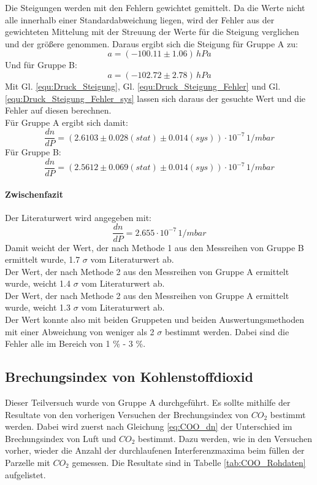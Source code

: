 \documentclass[12pt,a4paper]{article}
\begin{document}
Die Steigungen werden mit den Fehlern gewichtet gemittelt. Da die Werte nicht alle innerhalb einer Standardabweichung liegen, wird der Fehler aus der gewichteten Mittelung mit der Streuung der Werte für die Steigung verglichen und der größere genommen. Daraus ergibt sich die Steigung für Gruppe A zu:
\begin{equation*}
a = (-100.11 \pm 1.06) \, \si{hPa}
\end{equation*}
Und für Gruppe B:
\begin{equation*}
a = (-102.72 \pm 2.78) \, \si{hPa}
\end{equation*}
Mit Gl. \ref{equ:Druck_Steigung}, Gl. \ref{equ:Druck_Steigung_Fehler} und Gl. \ref{equ:Druck_Steigung_Fehler_sys} lassen sich daraus der gesuchte Wert und die Fehler auf diesen berechnen. \\
Für Gruppe A ergibt sich damit:
\begin{equation*}
\dfrac{dn}{dP} = (2.6103 \pm 0.028 (stat) \pm 0.014 (sys)) \cdot 10^{-7} \, \si{1/mbar}  
\end{equation*}
Für Gruppe B:
\begin{equation*}
\dfrac{dn}{dP} = (2.5612 \pm 0.069 (stat) \pm 0.014 (sys)) \cdot 10^{-7} \, \si{1/mbar}
\end{equation*}
\paragraph{Zwischenfazit}
Der Literaturwert wird angegeben mit:
\begin{equation*}
\dfrac{dn}{dP} = 2.655 \cdot 10^{-7} \, \si{1/mbar}
\end{equation*}
Damit weicht der Wert, der nach Methode 1 aus den Messreihen von Gruppe B ermittelt wurde, 1.7 $\sigma$ vom Literaturwert ab.\\
Der Wert, der nach Methode 2 aus den Messreihen von Gruppe A ermittelt wurde, weicht 1.4 $\sigma$ vom Literaturwert ab.\\
Der Wert, der nach Methode 2 aus den Messreihen von Gruppe A ermittelt wurde, weicht 1.3 $\sigma$ vom Literaturwert ab.\\
Der Wert konnte also mit beiden Gruppeten und beiden Auswertungsmethoden mit einer Abweichung von weniger als 2 $\sigma$ bestimmt werden. Dabei sind die Fehler alle im Bereich von 1 \% - 3 \%.

\newpage

\subsection{Brechungsindex von Kohlenstoffdioxid}
Dieser Teilversuch wurde von Gruppe A durchgeführt.
Es sollte mithilfe der Resultate von den vorherigen Versuchen der Brechungsindex von $CO_2$ bestimmt werden. Dabei wird zuerst nach Gleichung \ref{eq:COO_dn} der Unterschied im Brechungsindex von Luft und $CO_2$ bestimmt. Dazu werden, wie in den Versuchen vorher, wieder die Anzahl der durchlaufenen Interferenzmaxima beim füllen der Parzelle mit $CO_2$ gemessen. Die Resultate sind in Tabelle \ref{tab:COO_Rohdaten} aufgelistet.
\end{document}
